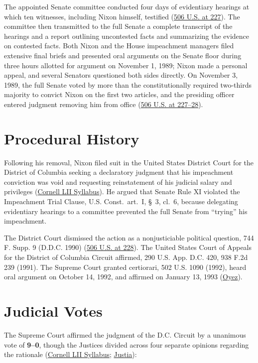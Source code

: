 \documentclass[12pt]{article}
\begin{document}
The appointed Senate committee conducted four days of evidentiary hearings at which ten witnesses, including Nixon himself, testified (\href{https://supreme.justia.com/cases/federal/us/506/224/}{506 U.S. at 227}). The committee then transmitted to the full Senate a complete transcript of the hearings and a report outlining uncontested facts and summarizing the evidence on contested facts. Both Nixon and the House impeachment managers filed extensive final briefs and presented oral arguments on the Senate floor during three hours allotted for argument on November 1, 1989; Nixon made a personal appeal, and several Senators questioned both sides directly. On November 3, 1989, the full Senate voted by more than the constitutionally required two-thirds majority to convict Nixon on the first two articles, and the presiding officer entered judgment removing him from office (\href{https://supreme.justia.com/cases/federal/us/506/224/}{506 U.S. at 227--28}).

\section{Procedural History}

Following his removal, Nixon filed suit in the United States District Court for the District of Columbia seeking a declaratory judgment that his impeachment conviction was void and requesting reinstatement of his judicial salary and privileges (\href{https://www.law.cornell.edu/supct/html/91-740.ZS.html}{Cornell LII Syllabus}). He argued that Senate Rule XI violated the Impeachment Trial Clause, U.S. Const.\ art.\ I, \S~3, cl.\ 6, because delegating evidentiary hearings to a committee prevented the full Senate from ``trying'' his impeachment.

The District Court dismissed the action as a nonjusticiable political question, 744 F. Supp. 9 (D.D.C. 1990) (\href{https://supreme.justia.com/cases/federal/us/506/224/}{506 U.S. at 228}). The United States Court of Appeals for the District of Columbia Circuit affirmed, 290 U.S. App. D.C. 420, 938 F.2d 239 (1991). The Supreme Court granted certiorari, 502 U.S. 1090 (1992), heard oral argument on October 14, 1992, and affirmed on January 13, 1993 (\href{https://www.oyez.org/cases/1992/91-740}{Oyez}).

\section{Judicial Votes}

The Supreme Court affirmed the judgment of the D.C. Circuit by a unanimous vote of \textbf{9--0}, though the Justices divided across four separate opinions regarding the rationale (\href{https://www.law.cornell.edu/supct/html/91-740.ZS.html}{Cornell LII Syllabus}; \href{https://supreme.justia.com/cases/federal/us/506/224/}{Justia}):
\end{document}
